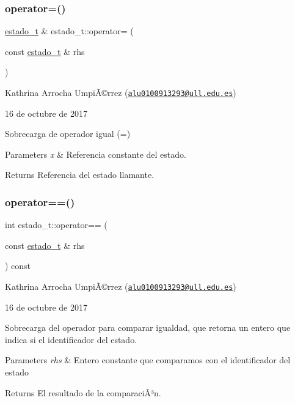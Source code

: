 \subsubsection{\texorpdfstring{operator=()}{operator=()}}
{\footnotesize\ttfamily \hyperlink{classestado__t}{estado\+\_\+t} \& estado\+\_\+t\+::operator= (\begin{DoxyParamCaption}\item[{const \hyperlink{classestado__t}{estado\+\_\+t} \&}]{rhs }\end{DoxyParamCaption})}

Kathrina Arrocha UmpiÃ©rrez (\href{mailto:alu0100913293@ull.edu.es}{\tt alu0100913293@ull.\+edu.\+es})

16 de octubre de 2017

Sobrecarga de operador igual (=)


\begin{DoxyParams}{Parameters}
{\em x} & Referencia constante del estado. \\
\hline
\end{DoxyParams}
\begin{DoxyReturn}{Returns}
Referencia del estado llamante. 
\end{DoxyReturn}
\mbox{\label{classestado__t_a5d35ac54bd5ae1378809345816366f23}} 
\subsubsection{\texorpdfstring{operator==()}{operator==()}}
{\footnotesize\ttfamily int estado\+\_\+t\+::operator== (\begin{DoxyParamCaption}\item[{const \hyperlink{classestado__t}{estado\+\_\+t} \&}]{rhs }\end{DoxyParamCaption}) const}

Kathrina Arrocha UmpiÃ©rrez (\href{mailto:alu0100913293@ull.edu.es}{\tt alu0100913293@ull.\+edu.\+es})

16 de octubre de 2017

Sobrecarga del operador para comparar igualdad, que retorna un entero que indica si el identificador del estado.


\begin{DoxyParams}{Parameters}
{\em rhs} & Entero constante que comparamos con el identificador del estado \\
\hline
\end{DoxyParams}
\begin{DoxyReturn}{Returns}
El resultado de la comparaciÃ³n. 
\end{DoxyReturn}

